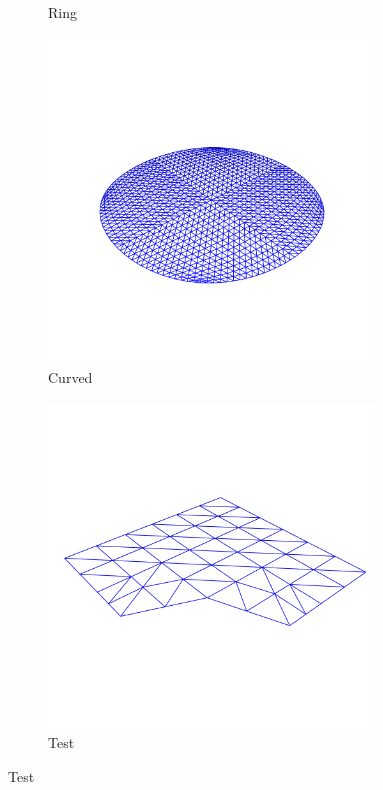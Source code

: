 \documentclass[crop=false,10pt,ngerman]{standalone}
\begin{document}
\begin{figure}[h]
\begin{subfigure}[b]{0.24\textwidth}
          \caption{Ring}
        \end{subfigure}
        \begin{subfigure}[b]{0.24\textwidth}
          \center
          \includegraphics[trim={0 0 0 2cm},clip,width=0.95\textwidth]{images/model-circle-1.png}
          \caption{Curved}
        \end{subfigure}
        \begin{subfigure}[b]{0.24\textwidth}
          \center
          \includegraphics[trim={0 0 0 2cm},clip,width=0.95\textwidth]{images/model-test-1.png}
          \caption{Test}
        \end{subfigure}
      \end{figure}
\end{document}
